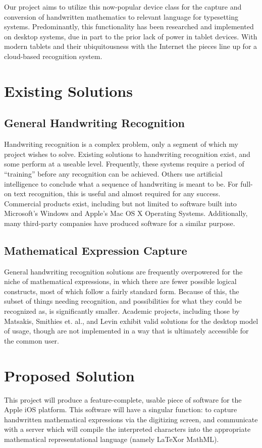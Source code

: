 \documentclass{acm_proc_article-sp}
\begin{document}
Our project aims to utilize this now-popular device class for the capture and conversion of handwritten mathematics to relevant language for typesetting systems. Predominantly, this functionality has been researched and implemented on desktop systems, due in part to the prior lack of power in tablet devices. With modern tablets and their ubiquitousness with the Internet the pieces line up for a cloud-based recognition system.
\section{Existing Solutions}

\subsection{General Handwriting Recognition} 
Handwriting recognition is a complex problem, only a segment of which my project wishes to solve. Existing solutions to handwriting recognition exist, and some  perform at a useable level. Frequently, these systems require a period of ``training'' before any recognition can be achieved. Others use artificial intelligence to conclude what a sequence of handwriting is meant to be. For full-on text recognition, this is useful and almost required for any success. Commercial products exist, including but not limited to software built into Microsoft's Windows and Apple's Mac OS X Operating Systems. Additionally, many third-party companies have produced software for a similar purpose.

\subsection{Mathematical Expression Capture}
General handwriting recognition solutions are frequently overpowered for the niche of mathematical expressions, in which there are fewer possible logical constructs, most of which follow a fairly standard form. Because of this, the subset of things needing recognition, and possibilities for what they could be recognized as, is significantly smaller. Academic projects, including those by Matsakis\cite{matsakis_recognition_1999}, Smithies et. al.\cite{smithies_handwriting-based_1999}, and Levin\cite{levin_cellwriter:_2007} exhibit valid solutions for the desktop model of usage, though are not implemented in a way that is ultimately accessible for the common user.

\section{Proposed Solution}
This project will produce a feature-complete, usable piece of software for the Apple iOS platform. This software will have a singular function: to capture handwritten mathematical expressions via the digitizing screen, and communicate with a server which will compile the interpreted characters into the appropriate mathematical representational language (namely \LaTeX or MathML). 
\end{document}
